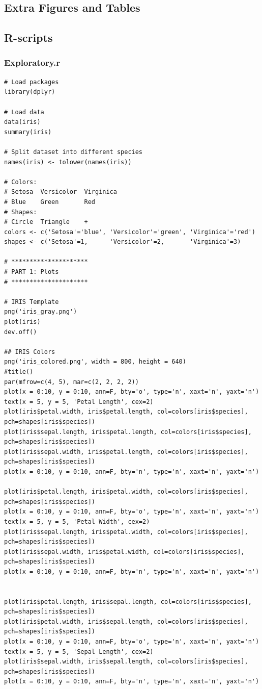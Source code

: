 \documentclass{article}
\begin{document}
\subsection{Extra Figures and Tables} 
\subsection{R-scripts}
\subsubsection{Exploratory.r}

\begin{lstlisting}[style=R]
# Load packages
library(dplyr)

# Load data
data(iris)
summary(iris)

# Split dataset into different species
names(iris) <- tolower(names(iris))

# Colors:
# Setosa  Versicolor  Virginica
# Blue    Green       Red
# Shapes:
# Circle  Triangle    +
colors <- c('Setosa'='blue', 'Versicolor'='green', 'Virginica'='red')
shapes <- c('Setosa'=1,      'Versicolor'=2,       'Virginica'=3)

# *********************
# PART 1: Plots
# *********************

# IRIS Template
png('iris_gray.png')
plot(iris)
dev.off()

## IRIS Colors
png('iris_colored.png', width = 800, height = 640)
#title()
par(mfrow=c(4, 5), mar=c(2, 2, 2, 2))
plot(x = 0:10, y = 0:10, ann=F, bty='o', type='n', xaxt='n', yaxt='n')
text(x = 5, y = 5, 'Petal Length', cex=2)
plot(iris$petal.width, iris$petal.length, col=colors[iris$species], pch=shapes[iris$species])
plot(iris$sepal.length, iris$petal.length, col=colors[iris$species], pch=shapes[iris$species])
plot(iris$sepal.width, iris$petal.length, col=colors[iris$species], pch=shapes[iris$species])
plot(x = 0:10, y = 0:10, ann=F, bty='n', type='n', xaxt='n', yaxt='n')

plot(iris$petal.length, iris$petal.width, col=colors[iris$species], pch=shapes[iris$species])
plot(x = 0:10, y = 0:10, ann=F, bty='o', type='n', xaxt='n', yaxt='n')
text(x = 5, y = 5, 'Petal Width', cex=2)
plot(iris$sepal.length, iris$petal.width, col=colors[iris$species], pch=shapes[iris$species])
plot(iris$sepal.width, iris$petal.width, col=colors[iris$species], pch=shapes[iris$species])
plot(x = 0:10, y = 0:10, ann=F, bty='n', type='n', xaxt='n', yaxt='n')


plot(iris$petal.length, iris$sepal.length, col=colors[iris$species], pch=shapes[iris$species])
plot(iris$petal.width, iris$sepal.length, col=colors[iris$species], pch=shapes[iris$species])
plot(x = 0:10, y = 0:10, ann=F, bty='o', type='n', xaxt='n', yaxt='n')
text(x = 5, y = 5, 'Sepal Length', cex=2)
plot(iris$sepal.width, iris$sepal.length, col=colors[iris$species], pch=shapes[iris$species])
plot(x = 0:10, y = 0:10, ann=F, bty='n', type='n', xaxt='n', yaxt='n')


\end{lstlisting}
\end{document}
